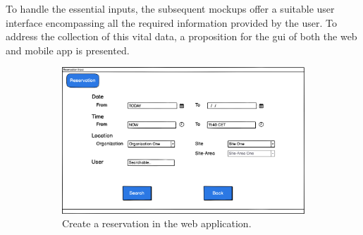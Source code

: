 \noindent To handle the essential inputs, the subsequent mockups offer a suitable user interface encompassing all the required information provided by the user. To address the collection of this vital data, a proposition for the \acrfull{gui} of both the web and mobile app is presented.

\begin{figure}[h]
    \centering
    \begin{subfigure}[c]{0.6\textwidth}
        \includegraphics[width=\textwidth]{resources/images/main/5_design/mockups/create_reservation/web/Reservation_Create.png}
        \captionsetup{skip=43pt}
        \caption{Create a reservation in the web application.}
        \label{fig:web-create-reservation-mockup}
    \end{subfigure}
    \hfill
    \begin{subfigure}[c]{0.3\textwidth}

\end{subfigure}
\end{figure}
